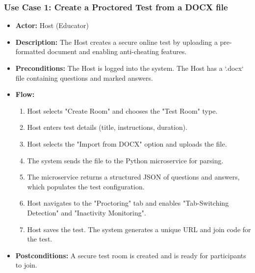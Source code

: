 \subsubsection{Use Case 1: Create a Proctored Test from a DOCX file}
\begin{itemize}
    \item \textbf{Actor:} Host (Educator)
    \item \textbf{Description:} The Host creates a secure online test by uploading a pre-formatted document and enabling anti-cheating features.
    \item \textbf{Preconditions:} The Host is logged into the system. The Host has a `.docx` file containing questions and marked answers.
    \item \textbf{Flow:}
    \begin{enumerate}
        \item Host selects "Create Room" and chooses the "Test Room" type.
        \item Host enters test details (title, instructions, duration).
        \item Host selects the "Import from DOCX" option and uploads the file.
        \item The system sends the file to the Python microservice for parsing.
        \item The microservice returns a structured JSON of questions and answers, which populates the test configuration.
        \item Host navigates to the "Proctoring" tab and enables "Tab-Switching Detection" and "Inactivity Monitoring".
        \item Host saves the test. The system generates a unique URL and join code for the test.
    \end{enumerate}
    \item \textbf{Postconditions:} A secure test room is created and is ready for participants to join.
\end{itemize}

\vspace{1cm}

